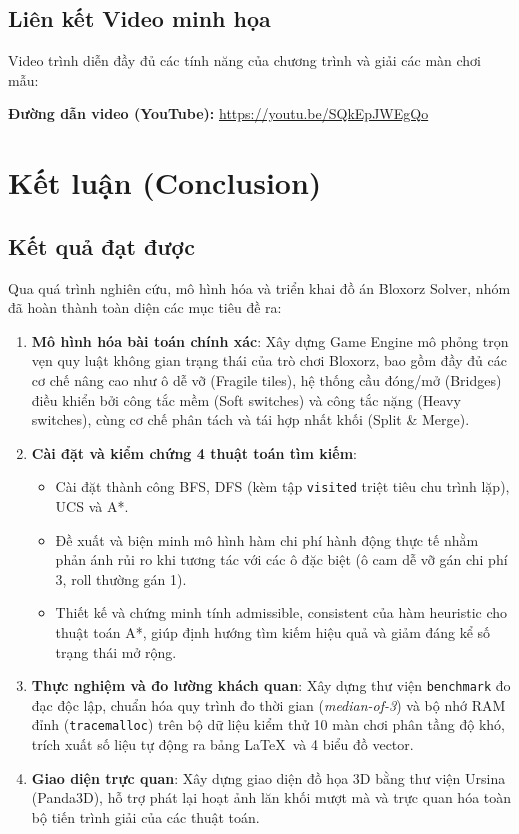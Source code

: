 \documentclass[12pt,a4paper]{article}
\begin{document}
\subsection{Liên kết Video minh họa}
Video trình diễn đầy đủ các tính năng của chương trình và giải các màn chơi mẫu:
\begin{center}
    \large
    \textbf{Đường dẫn video (YouTube):} \url{https://youtu.be/SQkEpJWEgQo}
\end{center}

\section{Kết luận (Conclusion)}

\subsection{Kết quả đạt được}
Qua quá trình nghiên cứu, mô hình hóa và triển khai đồ án Bloxorz Solver, nhóm đã hoàn thành toàn diện các mục tiêu đề ra:
\begin{enumerate}
    \item \textbf{Mô hình hóa bài toán chính xác}: Xây dựng Game Engine mô phỏng trọn vẹn quy luật không gian trạng thái của trò chơi Bloxorz, bao gồm đầy đủ các cơ chế nâng cao như ô dễ vỡ (Fragile tiles), hệ thống cầu đóng/mở (Bridges) điều khiển bởi công tắc mềm (Soft switches) và công tắc nặng (Heavy switches), cùng cơ chế phân tách và tái hợp nhất khối (Split \& Merge).
    \item \textbf{Cài đặt và kiểm chứng 4 thuật toán tìm kiếm}:
    \begin{itemize}
        \item Cài đặt thành công BFS, DFS (kèm tập \texttt{visited} triệt tiêu chu trình lặp), UCS và A*.
        \item Đề xuất và biện minh mô hình hàm chi phí hành động thực tế nhằm phản ánh rủi ro khi tương tác với các ô đặc biệt (ô cam dễ vỡ gán chi phí 3, roll thường gán 1).
        \item Thiết kế và chứng minh tính admissible, consistent của hàm heuristic cho thuật toán A*, giúp định hướng tìm kiếm hiệu quả và giảm đáng kể số trạng thái mở rộng.
    \end{itemize}
    \item \textbf{Thực nghiệm và đo lường khách quan}: Xây dựng thư viện \texttt{benchmark} đo đạc độc lập, chuẩn hóa quy trình đo thời gian (\textit{median-of-3}) và bộ nhớ RAM đỉnh (\texttt{tracemalloc}) trên bộ dữ liệu kiểm thử 10 màn chơi phân tầng độ khó, trích xuất số liệu tự động ra bảng \LaTeX\ và 4 biểu đồ vector.
    \item \textbf{Giao diện trực quan}: Xây dựng giao diện đồ họa 3D bằng thư viện Ursina (Panda3D), hỗ trợ phát lại hoạt ảnh lăn khối mượt mà và trực quan hóa toàn bộ tiến trình giải của các thuật toán.
\end{enumerate}
\end{document}
